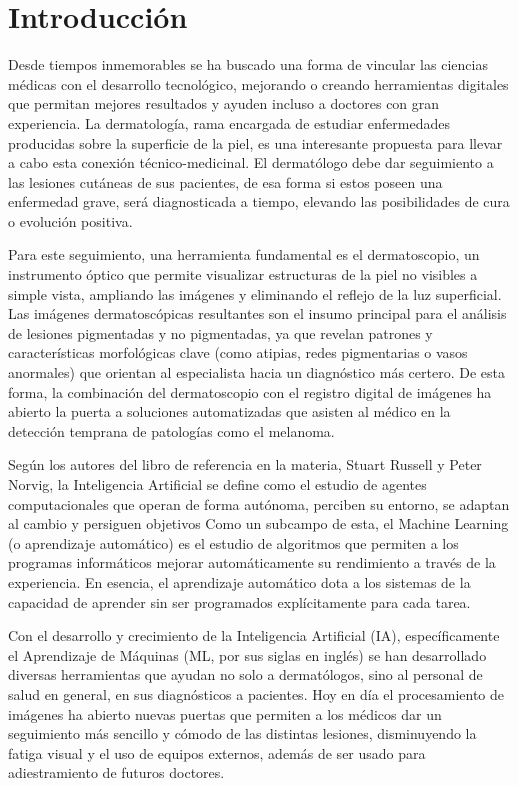 \chapter{Introducci\'on}
Desde tiempos inmemorables se ha buscado una forma de vincular las ciencias m\'edicas con
el desarrollo tecnol\'ogico, mejorando o creando herramientas digitales que permitan mejores
resultados y ayuden incluso a doctores con gran experiencia. La dermatolog\'ia, rama encargada 
de estudiar enfermedades producidas sobre la superficie de la piel, es una interesante propuesta 
para llevar a cabo esta conexi\'on t\'ecnico-medicinal. El dermat\'ologo debe dar seguimiento
a las lesiones cut\'aneas de sus pacientes, de esa forma si estos poseen una enfermedad 
grave, ser\'a diagnosticada a tiempo, elevando las posibilidades de cura o evoluci\'on positiva.

Para este seguimiento, una herramienta fundamental es el dermatoscopio, un instrumento 
\'optico que permite visualizar estructuras de la piel no visibles a simple vista, 
ampliando las im\'agenes y eliminando el reflejo de la luz superficial. Las im\'agenes 
dermatosc\'opicas resultantes son el insumo principal para el an\'alisis de lesiones 
pigmentadas y no pigmentadas, ya que revelan patrones y caracter\'isticas morfol\'ogicas 
clave (como atipias, redes pigmentarias o vasos anormales) que orientan al especialista 
hacia un diagn\'ostico m\'as certero. De esta forma, la combinaci\'on del dermatoscopio 
con el registro digital de im\'agenes ha abierto la puerta a soluciones automatizadas 
que asisten al m\'edico en la detecci\'on temprana de patolog\'ias como el melanoma.

Según los autores del libro de referencia en la materia, Stuart Russell y Peter Norvig, 
la Inteligencia Artificial se define como el estudio de agentes computacionales que operan 
de forma autónoma, perciben su entorno, se adaptan al cambio y persiguen objetivos\cite{inteligenciaArtificial}
Como un subcampo de esta, el Machine Learning (o aprendizaje automático) es el estudio 
de algoritmos que permiten a los programas informáticos mejorar automáticamente su 
rendimiento a través de la experiencia\cite{machineLearning}. En esencia, el aprendizaje automático dota a los 
sistemas de la capacidad de aprender sin ser programados explícitamente para cada tarea.

Con el desarrollo y crecimiento de la Inteligencia Artificial (IA), espec\'ificamente el Aprendizaje
de M\'aquinas (ML, por sus siglas en ingl\'es) se han desarrollado diversas herramientas que ayudan 
no solo a dermat\'ologos, sino al personal de salud en general, en sus diagn\'osticos a pacientes.
Hoy en d\'ia el procesamiento de im\'agenes ha abierto nuevas puertas que permiten a los m\'edicos
dar un seguimiento m\'as sencillo y c\'omodo de las distintas lesiones, disminuyendo la fatiga visual y
el uso de equipos externos, adem\'as de ser usado para adiestramiento de futuros doctores. 

